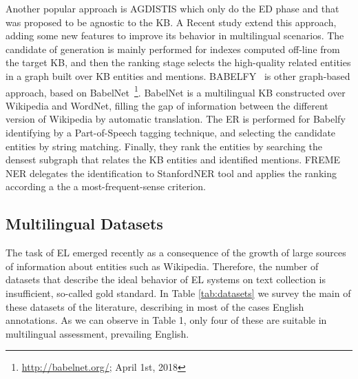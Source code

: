 \documentclass{llncs}
\begin{document}
Another popular approach is AGDISTIS\cite{usbeck2014agdistis} which only do the ED phase and that was proposed to be agnostic to the KB. A Recent study \cite{mag2017} extend this approach, adding some new features to improve its behavior in multilingual scenarios. The candidate of generation is mainly performed for indexes computed off-line from the target KB, and then the ranking stage selects the high-quality related entities in a graph built over KB entities and mentions. BABELFY~\cite{Babelfy-moro2014entity} is other graph-based approach, based on BabelNet~\footnote{\url{http://babelnet.org/}; April 1st, 2018}. BabelNet is a multilingual KB constructed over Wikipedia and WordNet, filling the gap of information between the different version of Wikipedia by automatic translation. The ER is performed for Babelfy identifying by a Part-of-Speech tagging technique, and selecting the candidate entities by string matching. Finally, they rank the entities by searching the densest subgraph that relates the KB entities and identified mentions. FREME NER delegates the identification to StanfordNER tool and applies the ranking according a the a most-frequent-sense criterion.


\subsection{Multilingual Datasets}

The task of EL emerged recently as a consequence of the growth of large sources of information about entities such as Wikipedia. Therefore, the number of datasets that describe the ideal behavior of EL systems on text collection is insufficient, so-called gold standard. In Table \ref{tab:datasets} we survey the main of these datasets of the literature, describing in most of the cases English annotations. As we can observe in Table 1, only four of these are suitable in multilingual assessment, prevailing English. 
\end{document}
